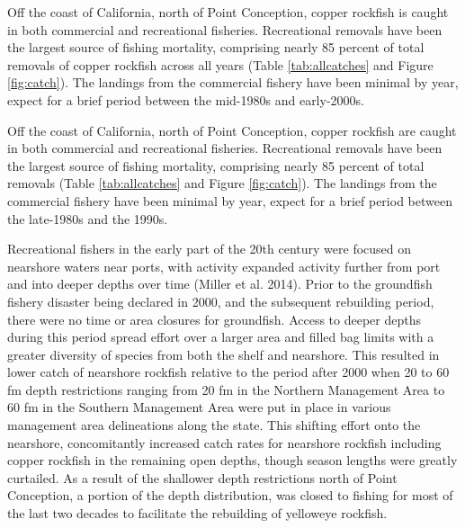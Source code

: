\documentclass[11pt,
  english,
  a4paper,
]{article}
\begin{document}
\leavevmode\tagmcend\tagstructend


Off the coast of California, north of Point Conception, copper rockfish is caught in both commercial and recreational fisheries. Recreational removals have been the largest source of fishing mortality, comprising nearly 85 percent of total removals of copper rockfish across all years (Table \ref{tab:allcatches} and Figure \ref{fig:catch}). The landings from the commercial fishery have been minimal by year, expect for a brief period between the mid-1980s and early-2000s.

\leavevmode\tagmcend\tagstructend\par


Off the coast of California, north of Point Conception, copper rockfish are caught in both commercial and recreational fisheries. Recreational removals have been the largest source of fishing mortality, comprising nearly 85 percent of total removals (Table \ref{tab:allcatches} and Figure \ref{fig:catch}). The landings from the commercial fishery have been minimal by year, expect for a brief period between the late-1980s and the 1990s.

\leavevmode\tagmcend\tagstructend\par


Recreational fishers in the early part of the 20th century were focused on nearshore waters near ports, with activity expanded activity further from port and into deeper depths over time {(Miller et al. 2014)\leavevmode\tagmcend\tagstructend}. Prior to the groundfish fishery disaster being declared in 2000, and the subsequent rebuilding period, there were no time or area closures for groundfish. Access to deeper depths during this period spread effort over a larger area and filled bag limits with a greater diversity of species from both the shelf and nearshore. This resulted in lower catch of nearshore rockfish relative to the period after 2000 when 20 to 60 fm depth restrictions ranging from 20 fm in the Northern Management Area to 60 fm in the Southern Management Area were put in place in various management area delineations along the state. This shifting effort onto the nearshore, concomitantly increased catch rates for nearshore rockfish including copper rockfish in the remaining open depths, though season lengths were greatly curtailed. As a result of the shallower depth restrictions north of Point Conception, a portion of the depth distribution, was closed to fishing for most of the last two decades to facilitate the rebuilding of yelloweye rockfish.
\end{document}
